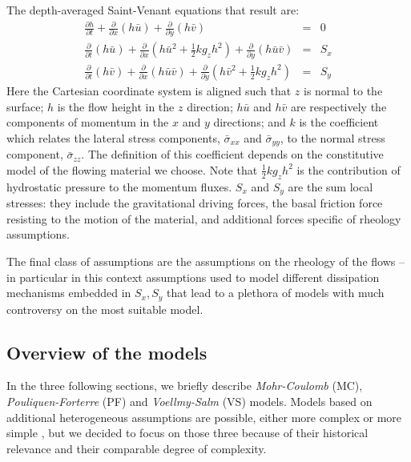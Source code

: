 \documentclass{article}
\begin{document}
The depth-averaged Saint-Venant equations that result are:
\begin{eqnarray}
\label{eq:D_A}
\frac{\partial h}{\partial t} +
\frac{\partial}{\partial x}(h \bar{u}) +
\frac{\partial}{\partial y}(h\bar{v}) &=& 0 \nonumber \\
\frac{\partial}{\partial t} (h\bar{u}) +
\frac{\partial}{\partial x}\left(h\bar{u}^2 + \frac{1}{2}k g_{z}h^2\right) + \frac{\partial}{\partial y}(h\bar{u}\bar{v}) &=& S_{x}\\
\frac{\partial}{\partial t} (h\bar{v}) +
\frac{\partial}{\partial x}(h\bar{u}\bar{v}) +
\frac{\partial}{\partial y}\left(h\bar{v}^2 + \frac{1}{2}k g_{z}h^2\right) &=& S_{y} \nonumber
\end{eqnarray}
Here the Cartesian coordinate system is aligned such that $z$ is normal to the surface; $h$ is the flow height in the $z$ direction; $h\bar{u}$ and $h\bar{v}$ are respectively the components of momentum in the $x$ and $y$ directions; and $k$ is the coefficient which relates the lateral stress components, $\bar{\sigma}_{xx}$ and $\bar{\sigma}_{yy}$, to the normal stress component, $\bar{\sigma}_{zz}$. The definition of this coefficient depends on the constitutive model of the flowing material we choose. Note that $\frac{1}{2} k g_z h^2$ is the contribution of hydrostatic pressure to the momentum fluxes. $S_x$ and $S_y$ are the sum local stresses: they include the gravitational driving forces, the basal friction force resisting to the motion of the material, and additional forces specific of rheology assumptions.

The final class of assumptions are the assumptions on the rheology of the flows -- in particular in this context assumptions used to model different dissipation mechanisms embedded in $S_x, S_y$ that lead to a plethora of models with much controversy on the most suitable model.

\subsection{Overview of the models}\label{subsec:Models}
In the three following sections, we briefly describe \emph{Mohr-Coulomb} (MC), \emph{Pouliquen-Forterre} (PF) and \emph{Voellmy-Salm} (VS) models. Models based on additional heterogeneous assumptions are possible, either more complex \citep{PitmanLe2005,Iverson2014} or more simple \citep{DadeHuppert1998}, but we decided to focus on those three because of their historical relevance and their comparable degree of complexity.
\end{document}
